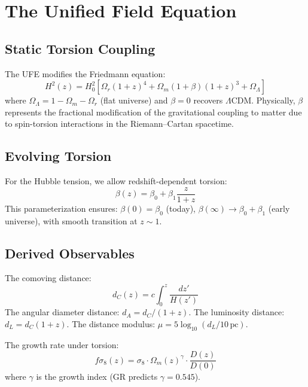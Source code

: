 \documentclass[twocolumn,prd,superscriptaddress,nofootinbib]{revtex4-2}
\begin{document}
\section{The Unified Field Equation}
\label{sec:ufe}

\subsection{Static Torsion Coupling}

The UFE modifies the Friedmann equation:
\begin{equation}
\boxed{H^2(z) = H_0^2\left[\Omega_r(1+z)^4 + \Omega_m(1+\beta)(1+z)^3 + \Omega_\Lambda\right]}
\label{eq:ufe}
\end{equation}
where $\Omega_\Lambda = 1 - \Omega_m - \Omega_r$ (flat universe) and $\beta = 0$ recovers $\Lambda$CDM. Physically, $\beta$ represents the fractional modification of the gravitational coupling to matter due to spin-torsion interactions in the Riemann--Cartan spacetime.

\subsection{Evolving Torsion}

For the Hubble tension, we allow redshift-dependent torsion:
\begin{equation}
\beta(z) = \beta_0 + \beta_1 \frac{z}{1+z}
\label{eq:beta_z}
\end{equation}
This parameterization ensures: $\beta(0) = \beta_0$ (today), $\beta(\infty) \to \beta_0 + \beta_1$ (early universe), with smooth transition at $z \sim 1$.

\subsection{Derived Observables}

The comoving distance:
\begin{equation}
d_C(z) = c\int_0^z \frac{dz'}{H(z')}
\end{equation}
The angular diameter distance: $d_A = d_C/(1+z)$.
The luminosity distance: $d_L = d_C(1+z)$.
The distance modulus: $\mu = 5\log_{10}(d_L/10\,\text{pc})$.

The growth rate under torsion:
\begin{equation}
f\sigma_8(z) = \sigma_8 \cdot \Omega_m(z)^\gamma \cdot \frac{D(z)}{D(0)}
\end{equation}
where $\gamma$ is the growth index (GR predicts $\gamma = 0.545$).
\end{document}
